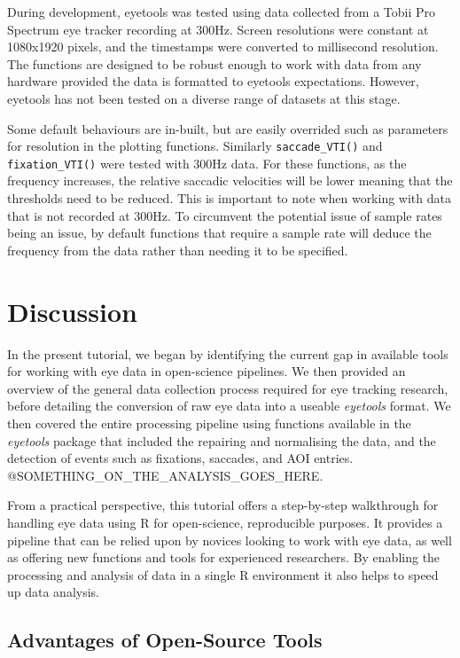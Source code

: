 \documentclass[
  man,
  floatsintext,
  longtable,
  nolmodern,
  notxfonts,
  notimes,
  colorlinks=true,linkcolor=blue,citecolor=blue,urlcolor=blue]{apa7}
\begin{document}
During development, eyetools was tested using data collected from a
Tobii Pro Spectrum eye tracker recording at 300Hz. Screen resolutions
were constant at 1080x1920 pixels, and the timestamps were converted to
millisecond resolution. The functions are designed to be robust enough
to work with data from any hardware provided the data is formatted to
eyetools expectations. However, eyetools has not been tested on a
diverse range of datasets at this stage.

Some default behaviours are in-built, but are easily overrided such as
parameters for resolution in the plotting functions. Similarly
\texttt{saccade\_VTI()} and \texttt{fixation\_VTI()} were tested with
300Hz data. For these functions, as the frequency increases, the
relative saccadic velocities will be lower meaning that the thresholds
need to be reduced. This is important to note when working with data
that is not recorded at 300Hz. To circumvent the potential issue of
sample rates being an issue, by default functions that require a sample
rate will deduce the frequency from the data rather than needing it to
be specified.

\section{Discussion}\label{discussion}

In the present tutorial, we began by identifying the current gap in
available tools for working with eye data in open-science pipelines. We
then provided an overview of the general data collection process
required for eye tracking research, before detailing the conversion of
raw eye data into a useable \emph{eyetools} format. We then covered the
entire processing pipeline using functions available in the
\emph{eyetools} package that included the repairing and normalising the
data, and the detection of events such as fixations, saccades, and AOI
entries. @SOMETHING\_ON\_THE\_ANALYSIS\_GOES\_HERE.

From a practical perspective, this tutorial offers a step-by-step
walkthrough for handling eye data using R for open-science, reproducible
purposes. It provides a pipeline that can be relied upon by novices
looking to work with eye data, as well as offering new functions and
tools for experienced researchers. By enabling the processing and
analysis of data in a single R environment it also helps to speed up
data analysis.

\subsection{Advantages of Open-Source
Tools}\label{advantages-of-open-source-tools}
\end{document}
